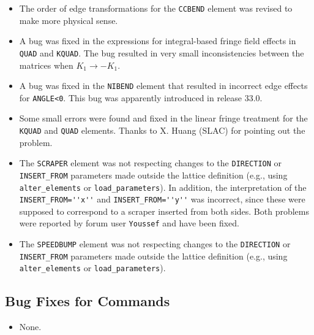 \documentclass[11pt]{article}
\begin{document}
\begin{itemize}
\item The order of edge transformations for the \verb|CCBEND| element was revised to make more physical sense.
\item A bug was fixed in the expressions for integral-based fringe field effects in \verb|QUAD| and \verb|KQUAD|.
  The bug resulted in very small inconsistencies between the matrices when $K_1 \rightarrow -K_1$.
\item A bug was fixed in the \verb|NIBEND| element that resulted in incorrect edge effects for \verb|ANGLE<0|.
  This bug was apparently introduced in release 33.0.
\item Some small errors were found and fixed in the linear fringe treatment for the \verb|KQUAD| and \verb|QUAD| elements.
  Thanks to X. Huang (SLAC) for pointing out the problem.
\item The \verb|SCRAPER| element was not respecting changes to the \verb|DIRECTION| or \verb|INSERT_FROM| parameters 
  made outside the lattice definition (e.g., using \verb|alter_elements| or \verb|load_parameters|). In addition,
  the interpretation of the \verb|INSERT_FROM=''x''| and \verb|INSERT_FROM=''y''| was incorrect, since these were
  supposed to correspond to a scraper inserted from both sides. Both problems were reported by forum user 
  \verb|Youssef| and have been fixed.
\item The \verb|SPEEDBUMP| element was not respecting changes to the \verb|DIRECTION| or \verb|INSERT_FROM| parameters 
  made outside the lattice definition (e.g., using \verb|alter_elements| or \verb|load_parameters|).
\end{itemize}

\subsection{Bug Fixes for Commands}
\begin{itemize}
\item None.
\end{itemize}
\end{document}
